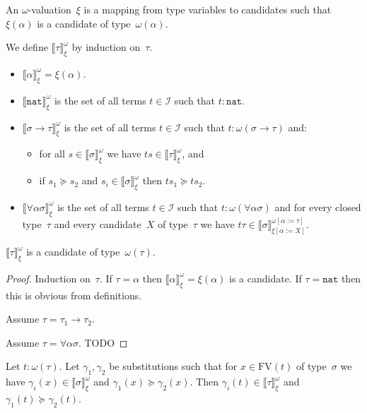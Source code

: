 \documentclass[runningheads,a4paper]{llncs}
\newcommand{\Iterms}{\mathcal{I}}
\newcommand{\arrtype}{\rightarrow}
\newcommand{\subst}[2]{#1:=#2}
\newcommand{\FV}{\mathrm{FV}}
\newcommand{\nat}{\mathtt{nat}}
\newcommand{\val}[3]{\ensuremath{\llbracket#1\rrbracket_{#2}^{#3}}}
\begin{document}
\begin{definition}\label{def_wm_valuation}\normalfont
  An $\omega$-valuation~$\xi$ is a mapping from type variables to
  candidates such that $\xi(\alpha)$ is a candidate of
  type~$\omega(\alpha)$.

  We define $\val{\tau}{\xi}{\omega}$ by induction on~$\tau$.
  \begin{itemize}
  \item $\val{\alpha}{\xi}{\omega} = \xi(\alpha)$.
  \item $\val{\nat}{\xi}{\omega}$ is the set of all terms $t \in
    \Iterms$ such that $t : \nat$.
  \item $\val{\sigma\arrtype\tau}{\xi}{\omega}$ is the set of all
    terms $t \in \Iterms$ such that $t : \omega(\sigma\arrtype\tau)$ and:
    \begin{itemize}
    \item for all $s \in \val{\sigma}{\xi}{\omega}$ we have $t s \in
      \val{\tau}{\xi}{\omega}$, and
    \item if $s_1 \succeq s_2$ and $s_i \in \val{\sigma}{\xi}{\omega}$
      then $t s_1 \succeq t s_2$.
    \end{itemize}
  \item $\val{\forall\alpha\sigma}{\xi}{\omega}$ is the set of all
    terms $t \in \Iterms$ such that $t : \omega(\forall\alpha\sigma)$
    and for every closed type~$\tau$ and every candidate~$X$ of
    type~$\tau$ we have $t \tau \in
    \val{\sigma}{\xi[\subst{\alpha}{X}]}{\omega[\subst{\alpha}{\tau}]}$.
  \end{itemize}
\end{definition}

\begin{lemma}
  $\val{\tau}{\xi}{\omega}$ is a candidate of type~$\omega(\tau)$.
\end{lemma}

\begin{proof}
  Induction on~$\tau$. If $\tau = \alpha$ then
  $\val{\alpha}{\xi}{\omega} = \xi(\alpha)$ is a candidate. If $\tau =
  \nat$ then this is obvious from definitions.

  Assume $\tau=\tau_1\arrtype\tau_2$.

  Assume $\tau=\forall\alpha\sigma$. TODO
\end{proof}

\begin{lemma}
  Let $t : \omega(\tau)$. Let $\gamma_1,\gamma_2$ be substitutions
  such that for $x \in \FV(t)$ of type~$\sigma$ we have $\gamma_i(x)
  \in \val{\sigma}{\xi}{\omega}$ and $\gamma_1(x) \succeq
  \gamma_2(x)$. Then $\gamma_i(t) \in \val{\tau}{\xi}{\omega}$ and
  $\gamma_1(t) \succeq \gamma_2(t)$.
\end{lemma}
\end{document}
